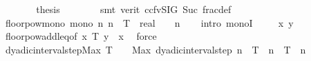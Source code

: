\begin{isabellebody}
\ \ \ \ \isamarkupfalse%
\ \isamarkupfalse%
\ {\isacharquery}{\kern0pt}thesis\isanewline
\ \ \ \ \ \ \isamarkupfalse%
\ {\isacharparenleft}{\kern0pt}smt\ {\isacharparenleft}{\kern0pt}verit{\isacharcomma}{\kern0pt}\ ccfv{\isacharunderscore}{\kern0pt}SIG{\isacharparenright}{\kern0pt}\ Suc\ frac{\isacharunderscore}{\kern0pt}def{\isacharparenright}{\kern0pt}\isanewline
\ \ \isamarkupfalse%
\isanewline
{}\isamarkupfalse%
%
\endisatagproof
{\isafoldproof}%
%
\isadelimproof
\isanewline
%
\endisadelimproof
\isanewline
{}\isamarkupfalse%
\ floor{\isacharunderscore}{\kern0pt}pow{}{\isacharunderscore}{\kern0pt}mono{\isacharcolon}{\kern0pt}\ {\isachardoublequoteopen}mono\ {\isacharparenleft}{\kern0pt}{\isasymlambda}n{\isachardot}{\kern0pt}\ {\isasymlfloor}{}{\isacharcircum}{\kern0pt}n\ {\isacharasterisk}{\kern0pt}\ {\isacharparenleft}{\kern0pt}T\ {\isacharcolon}{\kern0pt}{\isacharcolon}{\kern0pt}\ real{\isacharparenright}{\kern0pt}{\isasymrfloor}\ {\isacharslash}{\kern0pt}\ {}\ {\isacharcircum}{\kern0pt}\ n{\isacharparenright}{\kern0pt}{\isachardoublequoteclose}\isanewline
%
\isadelimproof
\ \ %
\endisadelimproof
%
\isatagproof
{}\isamarkupfalse%
\ {\isacharparenleft}{\kern0pt}intro\ monoI{\isacharparenright}{\kern0pt}\isanewline
\ \ \isamarkupfalse%
\ \ x\ y\isanewline
\ \ \ \ \isamarkupfalse%
\ floor{\isacharunderscore}{\kern0pt}pow{}{\isacharunderscore}{\kern0pt}add{\isacharunderscore}{\kern0pt}leq{\isacharbrackleft}{\kern0pt}of\ x\ T\ {\isachardoublequoteopen}y\ {\isacharminus}{\kern0pt}\ x{\isachardoublequoteclose}{\isacharbrackright}{\kern0pt}\ \isamarkupfalse%
\ force\isanewline
\ \ \isamarkupfalse%
%
\endisatagproof
{\isafoldproof}%
%
\isadelimproof
\isanewline
%
\endisadelimproof
\isanewline
{}\isamarkupfalse%
\ dyadic{\isacharunderscore}{\kern0pt}interval{\isacharunderscore}{\kern0pt}step{\isacharunderscore}{\kern0pt}Max{\isacharcolon}{\kern0pt}\ {\isachardoublequoteopen}T\ {\isasymge}\ {}\ {\isasymLongrightarrow}\ Max\ {\isacharparenleft}{\kern0pt}dyadic{\isacharunderscore}{\kern0pt}interval{\isacharunderscore}{\kern0pt}step\ n\ {}\ T{\isacharparenright}{\kern0pt}\ {\isacharequal}{\kern0pt}\ {\isasymlfloor}{}{\isacharcircum}{\kern0pt}n\ {\isacharasterisk}{\kern0pt}\ T{\isasymrfloor}\ {\isacharslash}{\kern0pt}\ {}{\isacharcircum}{\kern0pt}n{\isachardoublequoteclose}\isanewline

\end{isabellebody}
